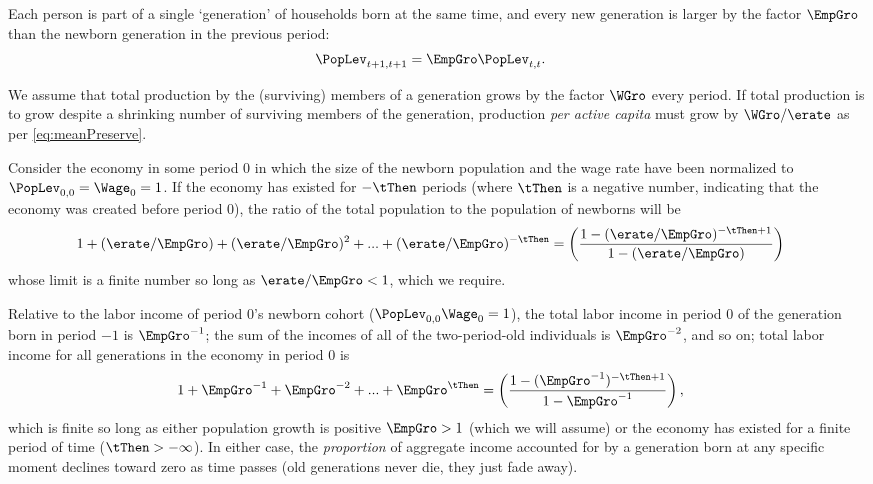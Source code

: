 \documentclass{\handout}
\begin{document}
Each person is part of a single `generation' of households born at the
same time, and every new generation is larger by the factor $\EmpGro$
than the newborn generation in the previous period:
\begin{equation}\begin{gathered}\begin{aligned}
  \PopLev_{t+1,t+1} & =  \EmpGro \PopLev_{t,t}
.
\end{aligned}\end{gathered}\end{equation}

We assume that total production by the (surviving) members of a generation grows by
the factor $\WGro$ every period.  If total production is to grow
despite a shrinking number of surviving members of the generation, 
production {\it per active capita} must grow by $\WGro/\erate$ as per \eqref{eq:meanPreserve}.

Consider the economy in some period 0 in which the size of the newborn population
and the wage rate have been normalized to $\PopLev_{0,0} = \Wage_{0} = 1$.  If the economy
has existed for $-\tThen$ periods (where $\tThen$ is a negative number, indicating that the economy was created before period 0), the ratio of the total population to the population
of newborns will be 
\begin{equation}\begin{gathered}\begin{aligned}
  1 + (\erate/\EmpGro)+ (\erate/\EmpGro)^{2}+ ... +(\erate/\EmpGro)^{-\tThen} & =  \left(\frac{1-(\erate/\EmpGro)^{-\tThen+1}}{1-(\erate/\EmpGro)}\right)
\end{aligned}\end{gathered}\end{equation}
whose limit is a finite number so long as $\erate/\EmpGro < 1$, which we require.

Relative to the labor income of period 0's newborn cohort ($\PopLev_{0,0} \Wage_{0} = 1$),
the total labor income in period 0 of the generation born in period $-1$ is $\EmpGro^{-1}$; the sum of the incomes of all of the two-period-old individuals is $\EmpGro^{-2}$, and so on; total labor income for all generations in the economy in period 0 is
\begin{equation}\begin{gathered}\begin{aligned}
  1 + \EmpGro^{-1}+ \EmpGro^{-2}+ ...+\EmpGro^{\tThen} & =  \left(\frac{1-(\EmpGro^{-1})^{-\tThen+1}}{1-\EmpGro^{-1}}\right) \label{eq:LabIncTot}
,
\end{aligned}\end{gathered}\end{equation}
which is finite so long as either population growth is positive $\EmpGro>1$ (which 
we will assume) or 
the economy has existed for a finite period of time ($\tThen > -\infty$).  
In either case, the {\it proportion} of aggregate income accounted for by a generation
born at any specific moment declines toward zero as time passes (old generations never die,
they just fade away).
\end{document}
